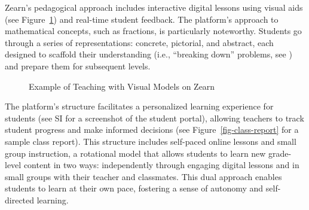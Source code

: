 \documentclass[
  number,
  preprint,
  3p,
  onecolumn]{elsarticle}
\begin{document}
Zearn's pedagogical approach includes interactive digital lessons using
visual aids (see Figure~\ref{fig-zearn-poster}) and real-time student
feedback. The platform's approach to mathematical concepts, such as
fractions, is particularly noteworthy. Students go through a series of
representations: concrete, pictorial, and abstract, each designed to
scaffold their understanding (i.e., ``breaking down'' problems, see
\citep{jumaat2014, reiser2014}) and prepare them for subsequent levels.

\begin{figure}


\caption{\label{fig-zearn-poster}Example of Teaching with Visual Models
on Zearn}

\end{figure}%

The platform's structure facilitates a personalized learning experience
for students (see SI for a screenshot of the student portal), allowing
teachers to track student progress and make informed decisions (see
Figure~\ref{fig-class-report} for a sample class report). This structure
includes self-paced online lessons and small group instruction, a
rotational model that allows students to learn new grade-level content
in two ways: independently through engaging digital lessons and in small
groups with their teacher and classmates. This dual approach enables
students to learn at their own pace, fostering a sense of autonomy and
self-directed learning.
\end{document}
